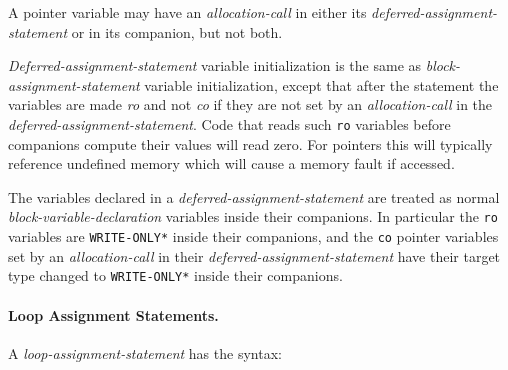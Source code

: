 \documentclass[12pt]{article}
\newcommand{\subsubsubsection}[1]{\paragraph[#1]{#1.}}
\newcommand{\EOL}{\penalty \exhyphenpenalty}
\begin{document}
A pointer variable may have an {\em allocation-call} in either its
{\em deferred-assignment-statement} or in its companion, but not
both.

{\em Deferred-assignment-statement} variable initialization is the
same as {\em block-assignment-state\-ment} variable initialization,
except that after the statement the variables
are made {\em ro} and not {\em co} if they are not set
by an {\em allocation-call} in the {\em deferred-assignment-statement}.
Code that reads such {\tt ro} variables
before companions compute their values will
read zero.  For pointers this will typically reference undefined memory which
will cause a memory fault if accessed.

The variables declared in a {\em deferred-assignment-statement} are treated as
normal {\em block-vari\-able-declaration} variables inside their companions.
In particular the {\tt ro} variables are {\tt *WRITE-\EOL ONLY*}
inside their companions, and the {\tt co} pointer variables set by
an {\em allocation-call} in their {\em deferred-assignment-statement}
have their target type changed to {\tt *WRITE-ONLY*}
inside their companions.

\subsubsubsection{Loop Assignment Statements}
\label{LOOP-ASSIGNMENT-STATEMENTS}

A {\em loop-assignment-statement} has the syntax:
\end{document}

